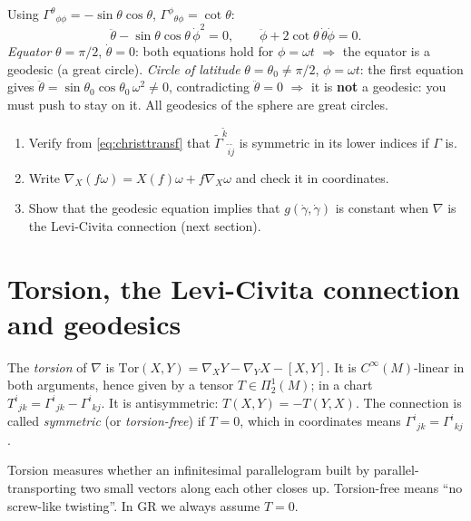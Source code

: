 \documentclass[11pt,a4paper]{article}
\numberwithin{equation}{section}
\theoremstyle{definition}
\theoremstyle{plain}
\newcommand{\TF}[2]{\Pi^{#1}_{#2}}                  %
\begin{document}
\begin{example}
Using $\Gamma^\theta{}_{\phi\phi}=-\sin\theta\cos\theta$, $\Gamma^\phi{}_{\theta\phi}=\cot\theta$:
\[
\ddot\theta-\sin\theta\cos\theta\,\dot\phi^2=0,\qquad\ddot\phi+2\cot\theta\,\dot\theta\dot\phi=0 .
\]
\textit{Equator} $\theta=\pi/2$, $\dot\theta=0$: both equations hold for $\phi=\omega t$ $\Rightarrow$ the equator is a geodesic (a great circle). \textit{Circle of latitude} $\theta=\theta_0\neq\pi/2$, $\phi=\omega t$: the first equation gives $\ddot\theta=\sin\theta_0\cos\theta_0\,\omega^2\neq0$, contradicting $\ddot\theta=0$ $\Rightarrow$ it is \textbf{not} a geodesic: you must push to stay on it. All geodesics of the sphere are great circles.
\end{example}

\begin{exercises}
\begin{enumerate}[nosep]
\item Verify from \eqref{eq:christtransf} that $\tilde\Gamma^{\tilde k}{}_{\tilde i\tilde j}$ is symmetric in its lower indices if $\Gamma$ is.
\item Write $\nabla_X(f\omega)=X(f)\omega+f\nabla_X\omega$ and check it in coordinates.
\item Show that the geodesic equation implies that $g(\dot\gamma,\dot\gamma)$ is constant when $\nabla$ is the Levi-Civita connection (next section).
\end{enumerate}
\end{exercises}


\section{Torsion, the Levi-Civita connection and geodesics}\label{sec:lc}

\begin{formal}[{torsion}]
The \emph{torsion} of $\nabla$ is $\mathrm{Tor}(X,Y)=\nabla_XY-\nabla_YX-[X,Y]$. It is $C^\infty(M)$-linear in both arguments, hence given by a tensor $T\in\TF{1}{2}(M)$; in a chart $T^i{}_{jk}=\Gamma^i{}_{jk}-\Gamma^i{}_{kj}$. It is antisymmetric: $T(X,Y)=-T(Y,X)$. The connection is called \emph{symmetric} (or \emph{torsion-free}) if $T=0$, which in coordinates means $\Gamma^i{}_{jk}=\Gamma^i{}_{kj}$.
\end{formal}
\begin{intuition}[{torsion = twisting of the frames}]
Torsion measures whether an infinitesimal parallelogram built by parallel-transporting two small vectors along each other closes up. Torsion-free means ``no screw-like twisting''. In GR we always assume $T=0$.
\end{intuition}
\end{document}

